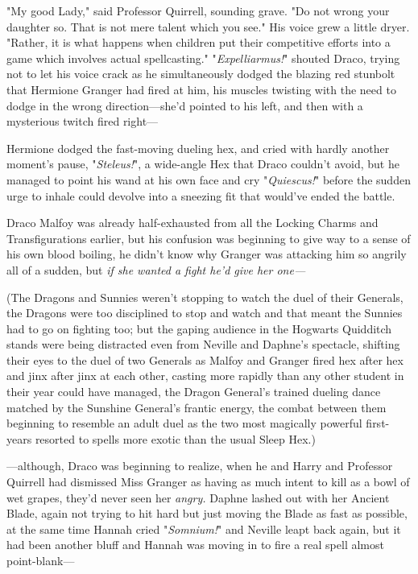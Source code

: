 "My good Lady," said Professor Quirrell, sounding grave. "Do not wrong your 
daughter so. That is not mere talent which you see." His voice grew a little 
dryer. "Rather, it is what happens when children put their competitive efforts 
into a game which involves actual spellcasting."
\sbreak
"\emph{Expelliarmus!}" shouted Draco, trying not to let his voice crack as he 
simultaneously dodged the blazing red stunbolt that Hermione Granger had fired 
at him, his muscles twisting with the need to dodge in the wrong 
direction---she'd pointed to his left, and then with a mysterious twitch fired 
right---

Hermione dodged the fast-moving dueling hex, and cried with hardly another 
moment's pause, "\emph{Steleus!}", a wide-angle Hex that Draco couldn't avoid, 
but he managed to point his wand at his own face and cry "\emph{Quiescus!}" 
before the sudden urge to inhale could devolve into a sneezing fit that 
would've ended the battle.

Draco Malfoy was already half-exhausted from all the Locking Charms and 
Transfigurations earlier, but his confusion was beginning to give way to a 
sense of his own blood boiling, he didn't know why Granger was attacking him so 
angrily all of a sudden, but \emph{if she wanted a fight he'd give her one---}

(The Dragons and Sunnies weren't stopping to watch the duel of their Generals, 
the Dragons were too disciplined to stop and watch and that meant the Sunnies 
had to go on fighting too; but the gaping audience in the Hogwarts Quidditch 
stands were being distracted even from Neville and Daphne's spectacle, shifting 
their eyes to the duel of two Generals as Malfoy and Granger fired hex after 
hex and jinx after jinx at each other, casting more rapidly than any other 
student in their year could have managed, the Dragon General's trained dueling 
dance matched by the Sunshine General's frantic energy, the combat between them 
beginning to resemble an adult duel as the two most magically powerful 
first-years resorted to spells more exotic than the usual Sleep Hex.)

---although, Draco was beginning to realize, when he and Harry and Professor 
Quirrell had dismissed Miss Granger as having as much intent to kill as a bowl 
of wet grapes, they'd never seen her \emph{angry.}
\sbreak
Daphne lashed out with her Ancient Blade, again not trying to hit hard but just 
moving the Blade as fast as possible, at the same time Hannah cried 
"\emph{Somnium!}" and Neville leapt back again, but it had been another bluff 
and Hannah was moving in to fire a real spell almost point-blank---

